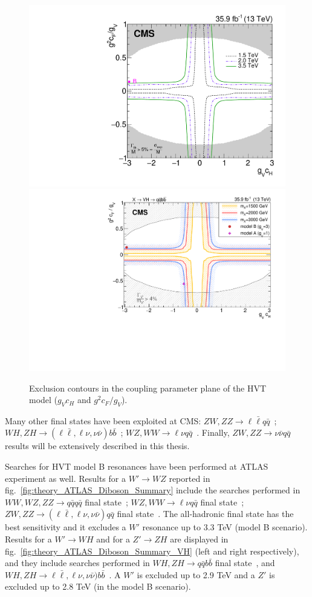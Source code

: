 \begin{figure}[!htb]
  \centering
    \includegraphics[height=.4\textwidth]{figures/B2G-17-001/CMS-B2G-17-001_Figure_007.pdf}%
    \includegraphics[height=.4\textwidth]{figures/B2G-17-002/CMS-B2G-17-002_Figure_007.pdf}
  \caption{Exclusion contours in the coupling parameter plane of the HVT model ($g_Vc_H$ and $g^2 c_F/g_V$).}
  \label{fig:theory_exclusion_parameter_plane}
\end{figure}
Many other final states have been exploited at CMS: $ZW, ZZ \rightarrow \ell \bar{\ell} q\bar{q}$~\cite{CMS-PAS-B2G-16-022}; $WH, ZH \rightarrow (\ell \bar{\ell}, \ell \nu, \nu \bar{\nu}) b \bar{b}$~\cite{Khachatryan:2016cfx}; $WZ, WW \rightarrow \ell \nu q \bar{q}$~\cite{CMS-PAS-B2G-16-020}. Finally, $ZW, ZZ \rightarrow \nu \bar{\nu} q \bar{q}$~\cite{CMS-PAS-B2G-17-005} results will be extensively described in this thesis.

\clearpage

Searches for HVT model B resonances have been performed at ATLAS experiment as well. Results for a $W' \rightarrow WZ$ reported in fig.~\ref{fig:theory_ATLAS_Diboson_Summary} include the searches performed in $WW, WZ, ZZ \rightarrow q \bar{q} q \bar{q}$ final state~\cite{Aaboud:2017eta}; $WZ, WW \rightarrow \ell \nu q \bar{q}$ final state~\cite{ATLAS-CONF-2017-051}; $ZW, ZZ \rightarrow (\ell \bar{\ell}, \ell \nu, \nu \bar{\nu}) q \bar{q}$ final state~\cite{ATLAS-CONF-2016-082}. The all-hadronic final state has the best sensitivity and it excludes a $W'$ resonance up to 3.3 TeV (model B scenario). Results for a $W' \rightarrow WH$ and for a $Z' \rightarrow ZH$ are displayed in fig.~\ref{fig:theory_ATLAS_Diboson_Summary_VH} (left and right respectively), and they include searches performed in $WH, ZH \rightarrow q \bar{q} b \bar{b}$ final state~\cite{Aaboud:2017ahz}, and $WH, ZH \rightarrow \ell \bar{\ell}, \ell \nu, \nu \bar{\nu}) b \bar{b}$~\cite{ATLAS-CONF-2017-055}. A $W'$ is excluded up to 2.9 TeV and a $Z'$ is excluded up to 2.8 TeV (in the model B scenario).

